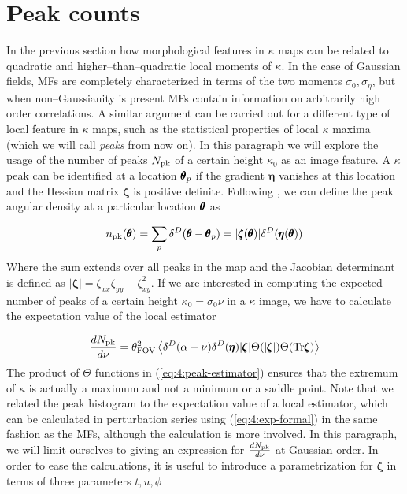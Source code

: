 \section{Peak counts}
In the previous section how morphological features in $\kappa$ maps can be related to quadratic and higher--than--quadratic local moments of $\kappa$. In the case of Gaussian fields, MFs are completely characterized in terms of the two moments $\sigma_0,\sigma_\eta$, but when non--Gaussianity is present MFs contain information on arbitrarily high order correlations. A similar argument can be carried out for a different type of local feature in $\kappa$ maps, such as the statistical properties of local $\kappa$ maxima (which we will call \textit{peaks} from now on). In this paragraph we will explore the usage of the number of peaks $N_{\rm pk}$ of a certain height $\kappa_0$ as an image feature. A $\kappa$ peak can be identified at a location $\pmb{\theta}_p$ if the gradient $\pmb{\eta}$ vanishes at this location and the Hessian matrix $\pmb{\zeta}$ is positive definite. Following \citep{BondCMB}, we can define the peak angular density at a particular location $\pmb{\theta}$ as 

\begin{equation}
\label{eq:4:peak-density}
n_{\rm pk}(\pmb{\theta}) = \sum_p \delta^D(\pmb{\theta}-\pmb{\theta}_p) = \vert\pmb{\zeta}(\pmb{\theta})\vert\delta^D(\pmb{\eta}(\pmb{\theta}))
\end{equation}
%
Where the sum extends over all peaks in the map and the Jacobian determinant is defined as $\vert\pmb{\zeta}\vert=\zeta_{xx}\zeta_{yy}-\zeta_{xy}^2$. If we are interested in computing the expected number of peaks of a certain height $\kappa_0=\sigma_0\nu$ in a $\kappa$ image, we have to calculate the expectation value of the local estimator

\begin{equation}
\label{eq:4:peak-estimator}
\frac{dN_{\rm pk}}{d\nu} = \theta^2_{\rm FOV}\left\langle\delta^D(\alpha-\nu)\delta^D(\pmb{\eta})\vert\pmb{\zeta}\vert\Theta(\vert\pmb{\zeta}\vert)\Theta({\rm Tr}\pmb{\zeta})\right\rangle
\end{equation}
%
The product of $\Theta$ functions in (\ref{eq:4:peak-estimator}) ensures that the extremum of $\kappa$ is actually a maximum and not a minimum or a saddle point. Note that we related the peak histogram to the expectation value of a local estimator, which can be calculated in perturbation series using (\ref{eq:4:exp-formal}) in the same fashion as the MFs, although the calculation is more involved. In this paragraph, we will limit ourselves to giving an expression for $\frac{dN_{\rm pk}}{d\nu}$ at Gaussian order. In order to ease the calculations, it is useful to introduce a parametrization for $\pmb{\zeta}$ in terms of three parameters $t,u,\phi$

